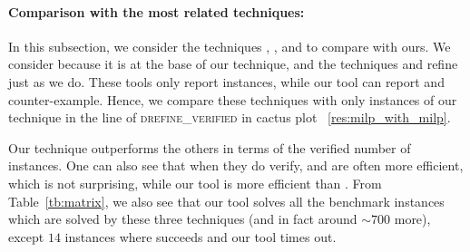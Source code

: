 




\paragraph{Comparison with the most related techniques:}
In this subsection, we consider the techniques \deeppoly{}, \kpoly{}, and \deepsrgr{} to compare with ours. 
We consider \deeppoly{} because it is at the base of our technique, and the techniques \kpoly{} and \deepsrgr{} refine \deeppoly{} just as we do. These tools only report \verified{} instances, while our tool can report  \verified{} and counter-example. Hence, we compare these techniques with only \verified{}  instances of our technique in the line of \textsc{drefine\_verified} in cactus plot ~\ref{res:milp_with_milp}. 

Our technique outperforms the others in terms of the verified number of instances. One can also see that when they do verify, \deeppoly{} and \kpoly{} are often more efficient, which is not surprising, while our tool is more efficient than \deepsrgr{}. From Table~\ref{tb:matrix}, we also see  that our tool solves all the benchmark instances which are solved by these three techniques (and in fact around $\sim 700$ more), %
except $14$ instances where \kpoly{} succeeds and our tool times out.

